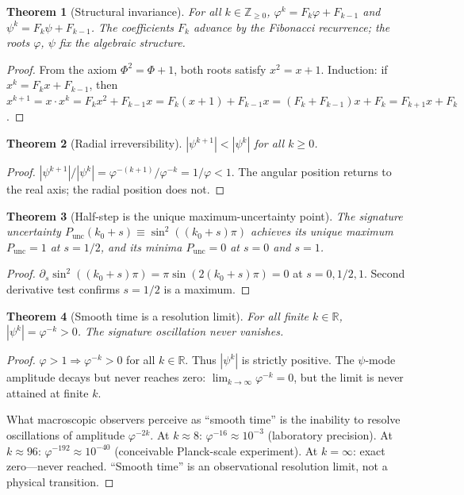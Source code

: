 \documentclass[12pt,a4paper]{article}
\newtheorem{theorem}{Theorem}[section]
\begin{document}
\begin{theorem}[Structural invariance]
\label{thm:structural-invariance}
For all $k \in \mathbb{Z}_{\geq 0}$, $\varphi^k = F_k\varphi + F_{k-1}$ and $\psi^k = F_k\psi + F_{k-1}$. The coefficients $F_k$ advance by the Fibonacci recurrence; the roots $\varphi$, $\psi$ fix the algebraic structure.
\end{theorem}
\begin{proof}
From the axiom $\Phi^2 = \Phi + 1$, both roots satisfy $x^2 = x + 1$. Induction: if $x^k = F_k x + F_{k-1}$, then $x^{k+1} = x\cdot x^k = F_k x^2 + F_{k-1} x = F_k(x+1) + F_{k-1} x = (F_k+F_{k-1})x + F_k = F_{k+1}x + F_k$.
\end{proof}

\begin{theorem}[Radial irreversibility]
\label{thm:irreversibility}
$|\psi^{k+1}| < |\psi^k|$ for all $k \geq 0$.
\end{theorem}
\begin{proof}
$|\psi^{k+1}|/|\psi^k| = \varphi^{-(k+1)}/\varphi^{-k} = 1/\varphi < 1$. The angular position returns to the real axis; the radial position does not.
\end{proof}

\begin{theorem}[Half-step is the unique maximum-uncertainty point]
\label{thm:half-step}
The signature uncertainty $P_{\mathrm{unc}}(k_0+s) \equiv \sin^2((k_0{+}s)\pi)$ achieves its unique maximum $P_{\mathrm{unc}} = 1$ at $s = 1/2$, and its minima $P_{\mathrm{unc}} = 0$ at $s = 0$ and $s = 1$.
\end{theorem}
\begin{proof}
$\partial_s \sin^2((k_0+s)\pi) = \pi\sin(2(k_0+s)\pi) = 0$ at $s = 0, 1/2, 1$. Second derivative test confirms $s = 1/2$ is a maximum.
\end{proof}

\begin{theorem}[Smooth time is a resolution limit]
\label{thm:no-smooth-time}
For all finite $k \in \mathbb{R}$, $|\psi^k| = \varphi^{-k} > 0$. The signature oscillation never vanishes.
\end{theorem}
\begin{proof}
$\varphi > 1 \Rightarrow \varphi^{-k} > 0$ for all $k \in \mathbb{R}$. Thus $|\psi^k|$ is strictly positive. The $\psi$-mode amplitude decays but never reaches zero: $\lim_{k\to\infty} \varphi^{-k} = 0$, but the limit is never attained at finite $k$.

What macroscopic observers perceive as ``smooth time'' is the inability to resolve oscillations of amplitude $\varphi^{-2k}$. At $k \approx 8$: $\varphi^{-16} \approx 10^{-3}$ (laboratory precision). At $k \approx 96$: $\varphi^{-192} \approx 10^{-40}$ (conceivable Planck-scale experiment). At $k = \infty$: exact zero---never reached. ``Smooth time'' is an observational resolution limit, not a physical transition.
\end{proof}
\end{document}
